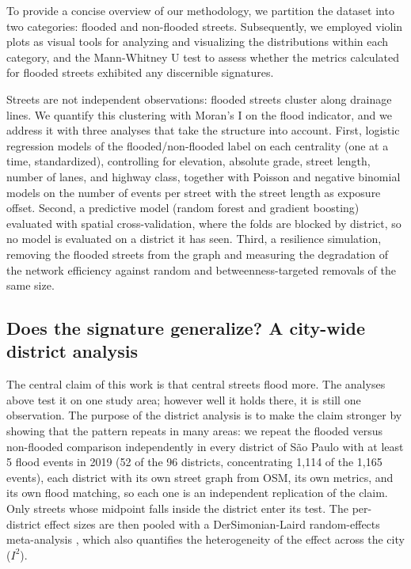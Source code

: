 \documentclass[sn-nature]{sn-jnl}%
\theoremstyle{thmstyleone}%
\theoremstyle{thmstyletwo}%
\theoremstyle{thmstylethree}%
\begin{document}
To provide a concise overview of our methodology, we partition the dataset into two categories: flooded and non-flooded streets. Subsequently, we employed violin plots as visual tools for analyzing and visualizing the distributions within each category, and the Mann-Whitney U test to assess whether the metrics calculated for flooded streets exhibited any discernible signatures.

Streets are not independent observations: flooded streets cluster along drainage lines. We quantify this clustering with Moran's I on the flood indicator, and we address it with three analyses that take the structure into account. First, logistic regression models of the flooded/non-flooded label on each centrality (one at a time, standardized), controlling for elevation, absolute grade, street length, number of lanes, and highway class, together with Poisson and negative binomial models on the number of events per street with the street length as exposure offset. Second, a predictive model (random forest and gradient boosting) evaluated with spatial cross-validation, where the folds are blocked by district, so no model is evaluated on a district it has seen. Third, a resilience simulation, removing the flooded streets from the graph and measuring the degradation of the network efficiency against random and betweenness-targeted removals of the same size.

\subsection{Does the signature generalize? A city-wide district analysis}
\label{sec:districts}

The central claim of this work is that central streets flood more. The analyses above test it on one study area; however well it holds there, it is still one observation. The purpose of the district analysis is to make the claim stronger by showing that the pattern repeats in many areas: we repeat the flooded versus non-flooded comparison independently in every district of São Paulo with at least 5 flood events in 2019 (52 of the 96 districts, concentrating 1,114 of the 1,165 events), each district with its own street graph from OSM, its own metrics, and its own flood matching, so each one is an independent replication of the claim. Only streets whose midpoint falls inside the district enter its test. The per-district effect sizes are then pooled with a DerSimonian-Laird random-effects meta-analysis \cite{dersimonian1986}, which also quantifies the heterogeneity of the effect across the city ($I^2$).
\end{document}
